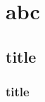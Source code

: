 \documentclass[PhD]{iitmdiss}
\begin{document}
%
%
%
%
%
%
%
%


\chapter{abc}\label{lit}

\section{title}

\subsection{title}
\end{document}
